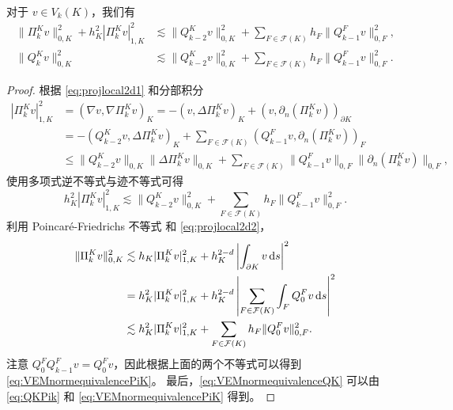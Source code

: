 \begin{lemma}
对于 $v\in V_k(K)$，我们有
\begin{align}
\|\Pi_k^Kv\|_{0,K}^2+h_K^2|\Pi_k^Kv|_{1,K}^2&\lesssim \|Q_{k-2}^Kv\|_{0,K}^2+\sum_{F\in\mathcal F(K)}h_F\|Q_{k-1}^Fv\|_{0,F}^2, \label{eq:VEMnormequivalencePiK}\\
\|Q_k^Kv\|_{0,K}^2&\lesssim \|Q_{k-2}^Kv\|_{0,K}^2+\sum_{F\in\mathcal F(K)}h_F\|Q_{k-1}^Fv\|_{0,F}^2. \label{eq:VEMnormequivalenceQK}
\end{align}
\end{lemma}
\begin{proof}
根据 \eqref{eq:projlocal2d1} 和分部积分
\begin{align*}
|\Pi_k^Kv|_{1,K}^2&=(\nabla v, \nabla\Pi_k^Kv)_K=-(v, \Delta\Pi_k^Kv)_K+(v, \partial_n(\Pi_k^Kv))_{\partial K} \\
&=-(Q_{k-2}^Kv, \Delta\Pi_k^Kv)_K+\sum_{F\in\mathcal F(K)}(Q_{k-1}^Fv, \partial_n(\Pi_k^Kv))_{F} \\
&\leq\|Q_{k-2}^Kv\|_{0,K}\|\Delta\Pi_k^Kv\|_{0,K}+\sum_{F\in\mathcal F(K)}\|Q_{k-1}^Fv\|_{0,F}\|\partial_n(\Pi_k^Kv)\|_{0,F},
\end{align*}
使用多项式逆不等式与迹不等式可得
\[%
h_K^2|\Pi_k^Kv|_{1,K}^2\lesssim \|Q_{k-2}^Kv\|_{0,K}^2+\sum_{F\in\mathcal F(K)}h_F\|Q_{k-1}^Fv\|_{0,F}^2. 
\]
利用 Poincar\'e-Friedrichs 不等式 %
和 \eqref{eq:projlocal2d2}，
\begin{align*}  
\|\Pi_k^Kv\|_{0,K}^2&\lesssim h_K|\Pi_k^Kv|_{1,K}^2+h_K^{2-d}\left|\int_{\partial K}v\,{\rm d}s\right|^2 \\
&=h_K^2|\Pi_k^Kv|_{1,K}^2+h_K^{2-d}\left|\sum_{F\in\mathcal F(K)}\int_{F}Q_{0}^Fv\,{\rm d}s\right|^2 \\
&\lesssim h_K^2|\Pi_k^Kv|_{1,K}^2+\sum_{F\in\mathcal F(K)}h_F\|Q_{0}^Fv\|_{0,F}^2.
\end{align*}
注意 $Q_0^FQ_{k-1}^Fv=Q_{0}^Fv$，因此根据上面的两个不等式可以得到
\eqref{eq:VEMnormequivalencePiK}。
最后，\eqref{eq:VEMnormequivalenceQK} 可以由 \eqref{eq:QKPik} 和 \eqref{eq:VEMnormequivalencePiK} 得到。
\end{proof}

